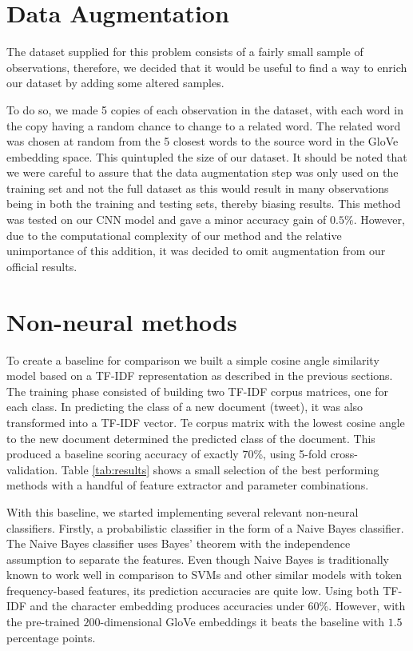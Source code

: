 \documentclass[journal, ]{IEEEtran}
\begin{document}
\section{Data Augmentation}
The dataset supplied for this problem consists of a fairly small sample of observations, therefore, we decided that it would be useful to find a way to enrich our dataset by adding some altered samples.

To do so, we made 5 copies of each observation in the dataset, with each word in the copy having a random chance to change to a related word. The related word was chosen at random from the 5 closest words to the source word in the GloVe embedding space. This quintupled the size of our dataset.
It should be noted that we were careful to assure that the data augmentation step was only used on the training set and not the full dataset as this would result in many observations being in both the training and testing sets, thereby biasing results.
This method was tested on our CNN model and gave a minor accuracy gain of $0.5\%$. However, due to the computational complexity of our method and the relative unimportance of this addition, it was decided to omit augmentation from our official results.

\section{Non-neural methods}
To create a baseline for comparison we built a simple cosine angle similarity model based on a TF-IDF representation as described in the previous sections. The training phase consisted of building two TF-IDF corpus matrices, one for each class. In predicting the class of a new document (tweet), it was also transformed into a TF-IDF vector. Te corpus matrix with the lowest cosine angle to the new document determined the predicted class of the document. This produced a baseline scoring accuracy of exactly $70$\%, using 5-fold cross-validation. 
Table \ref{tab:results} shows a small selection of the best performing methods with a handful of feature extractor and parameter combinations. 

With this baseline, we started implementing several relevant non-neural classifiers. Firstly, a probabilistic classifier in the form of a Naive Bayes classifier. The Naive Bayes classifier uses Bayes' theorem with the independence assumption to separate the features. Even though Naive Bayes is traditionally known to work well in comparison to SVMs and other similar models with token frequency-based features, its prediction accuracies are quite low. Using both TF-IDF and the character embedding produces accuracies under $60$\%. However, with the pre-trained $200$-dimensional GloVe embeddings it beats the baseline with $1.5$ percentage points. 
\end{document}
